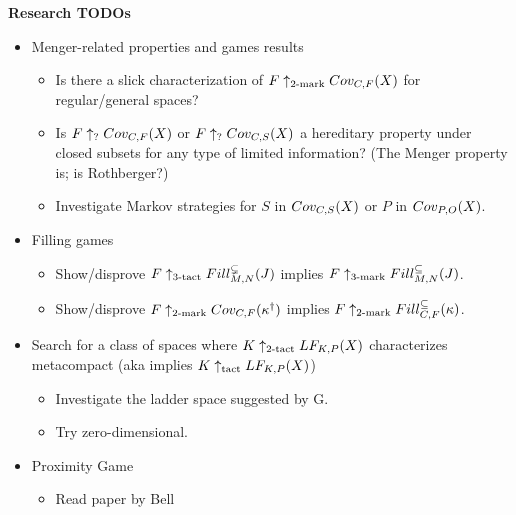 


\centerline{\bf Research TODOs}

  \begin{itemize}
    \item Menger-related properties and games results
      \begin{itemize}
        \item Is there a slick characterization of $F\uparrow_{2\text{-mark}}Cov_{C,F}(X)$ for regular/general spaces?
        \item Is $F\uparrow_{?}Cov_{C,F}(X)$ or $F\uparrow_{?}Cov_{C,S}(X)$ a hereditary property under closed subsets for any type of limited information? (The Menger property is; is Rothberger?)
        \item Investigate Markov strategies for $S$ in $Cov_{C,S}(X)$ or $P$ in $Cov_{P,O}(X)$.
      \end{itemize}
    \item Filling games
      \begin{itemize}
        \item Show/disprove $F\uparrow_{3\text{-tact}}Fill^{\subsetneq}_{M,N}(J)$ implies $F\uparrow_{3\text{-mark}}Fill^{\subseteq}_{M,N}(J)$.
        \item Show/disprove $F\uparrow_{2\text{-mark}}Cov_{C,F}(\kappa^\dagger)$ implies $F\uparrow_{2\text{-mark}}Fill^{\subseteq}_{C,F}(\kappa)$.
      \end{itemize}
    \item Search for a class of spaces where $K\uparrow_{2\text{-tact}}LF_{K,P}(X)$ characterizes metacompact (aka implies $K\uparrow_{\text{tact}}LF_{K,P}(X)$)
      \begin{itemize}
        \item Investigate the ladder space suggested by G.
        \item Try zero-dimensional.
      \end{itemize}
    \item Proximity Game
      \begin{itemize}
        \item Read paper by Bell
      \end{itemize}
  \end{itemize}
